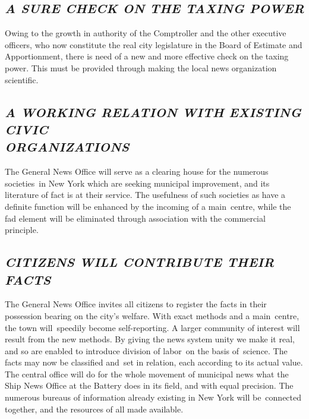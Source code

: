 \documentclass[twoside,symmetric,nobib,justified]{tufte-book}
\begin{document}
\hypertarget{a-sure-check-on-the-taxing-power}{%
\subsection{\emph{A SURE CHECK ON THE TAXING
POWER}}\label{a-sure-check-on-the-taxing-power}}

Owing to the growth in authority of the Comptroller and the other
executive officers, who now constitute the real city legislature in the
Board of Estimate and Apportionment, there is need of a new and more
effective check on the taxing power. This must be provided through
making the local news organization scientific.~

\hypertarget{a-working-relation-with-existing-civic-organizations}{%
\subsection{\emph{A WORKING RELATION WITH EXISTING CIVIC\\\noindent ORGANIZATIONS}}\label{a-working-relation-with-existing-civic-organizations}}

The General News Office will serve as a clearing house for the numerous
societies~in New York which are seeking municipal improvement, and its
literature of fact is at their service. The usefulness of such societies
as have a definite function will be enhanced by the incoming of a
main~centre, while the fad element will be eliminated through
association with the commercial principle.~

\hypertarget{citizens-will-contribute-their-facts}{%
\subsection{\emph{CITIZENS WILL CONTRIBUTE THEIR
FACTS}}\label{citizens-will-contribute-their-facts}}

The General News Office invites all citizens to register the facts in
their possession bearing on the city's welfare. With exact methods and a
main~centre, the town will~speedily become self-reporting. A larger
community of interest will result from the new methods. By giving the
news system unity we make it real, and so are enabled to introduce
division of labor~on the basis of~science. The facts may now be
classified and~set in relation, each according to its actual value. The
central office will do for the whole movement of municipal news what the
Ship News Office at the Battery does in its field, and with equal
precision. The numerous bureaus of information already existing in New
York will be~connected together, and the resources of all made
available.~
\end{document}
